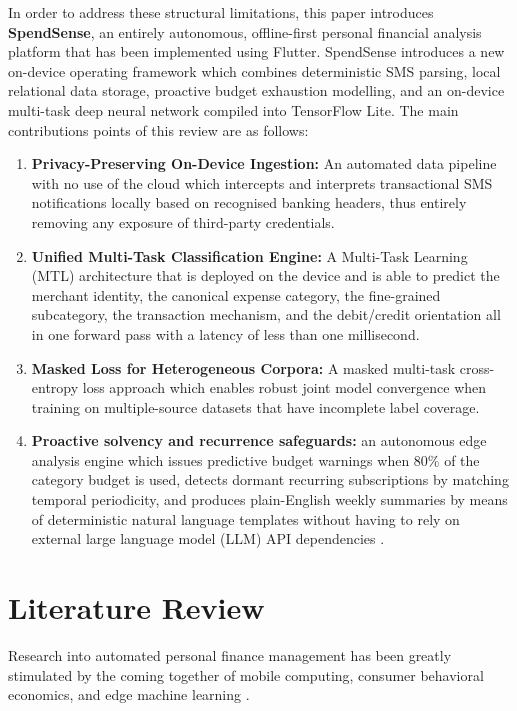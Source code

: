 \documentclass[conference]{IEEEtran}
\begin{document}
In order to address these structural limitations, this paper introduces \textbf{SpendSense}, an entirely autonomous, offline-first personal financial analysis platform that has been implemented using Flutter. SpendSense introduces a new on-device operating framework which combines deterministic SMS parsing, local relational data storage, proactive budget exhaustion modelling, and an on-device multi-task deep neural network compiled into TensorFlow Lite. The main contributions points of this review are as follows:
\begin{enumerate}
    \item \textbf{Privacy-Preserving On-Device Ingestion:} An automated data pipeline with no use of the cloud which intercepts and interprets transactional SMS notifications locally based on recognised banking headers, thus entirely removing any exposure of third-party credentials.
    \item \textbf{Unified Multi-Task Classification Engine:} A Multi-Task Learning (MTL) architecture that is deployed on the device and is able to predict the merchant identity, the canonical expense category, the fine-grained subcategory, the transaction mechanism, and the debit/credit orientation all in one forward pass with a latency of less than one millisecond.
    \item \textbf{Masked Loss for Heterogeneous Corpora:} A masked multi-task cross-entropy loss approach which enables robust joint model convergence when training on multiple-source datasets that have incomplete label coverage.
    \item \textbf{Proactive solvency and recurrence safeguards:} an autonomous edge analysis engine which issues predictive budget warnings when 80\% of the category budget is used, detects dormant recurring subscriptions by matching temporal periodicity, and produces plain-English weekly summaries by means of deterministic natural language templates without having to rely on external large language model (LLM) API dependencies \cite{lusardi2014}.
\end{enumerate}

\section{Literature Review}
Research into automated personal finance management has been greatly stimulated by the coming together of mobile computing, consumer behavioral economics, and edge machine learning \cite{xiao2016}.
\end{document}
